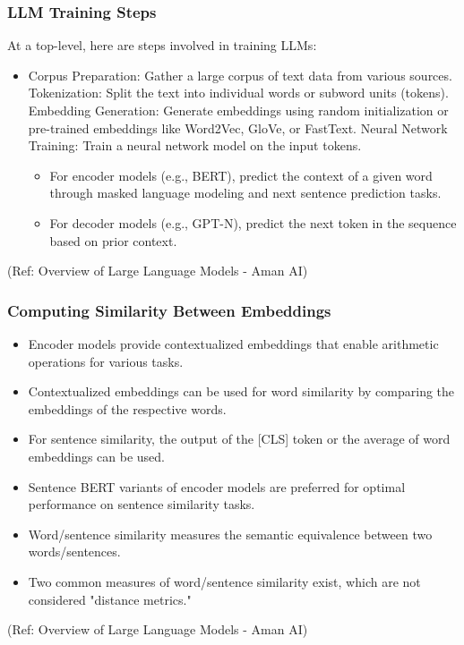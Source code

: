 \begin{frame}[fragile]\frametitle{LLM Training Steps}

At a top-level, here are steps involved in training LLMs:

\begin{itemize}
\item Corpus Preparation: Gather a large corpus of text data from various sources.
Tokenization: Split the text into individual words or subword units (tokens).
Embedding Generation: Generate embeddings using random initialization or pre-trained embeddings like Word2Vec, GloVe, or FastText.
Neural Network Training: Train a neural network model on the input tokens.
\begin{itemize}
\item For encoder models (e.g., BERT), predict the context of a given word through masked language modeling and next sentence prediction tasks.
\item For decoder models (e.g., GPT-N), predict the next token in the sequence based on prior context.
\end{itemize}
\end{itemize}

				
{\tiny (Ref: Overview of Large Language Models - Aman AI)}

\end{frame}

\begin{frame}[fragile]\frametitle{Computing Similarity Between Embeddings}


\begin{itemize}
\item Encoder models provide contextualized embeddings that enable arithmetic operations for various tasks.
\item Contextualized embeddings can be used for word similarity by comparing the embeddings of the respective words.
\item For sentence similarity, the output of the [CLS] token or the average of word embeddings can be used.
\item Sentence BERT variants of encoder models are preferred for optimal performance on sentence similarity tasks.
\item Word/sentence similarity measures the semantic equivalence between two words/sentences.
\item Two common measures of word/sentence similarity exist, which are not considered "distance metrics."
\end{itemize}

				
{\tiny (Ref: Overview of Large Language Models - Aman AI)}

\end{frame}


